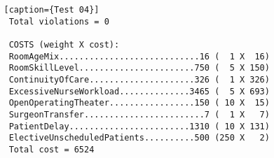 \begin{lstlisting}   [caption={Test 04}]
    Total violations = 0
    
    COSTS (weight X cost): 
    RoomAgeMix............................16 (  1 X  16)
    RoomSkillLevel.......................750 (  5 X 150)
    ContinuityOfCare.....................326 (  1 X 326)
    ExcessiveNurseWorkload..............3465 (  5 X 693)
    OpenOperatingTheater.................150 ( 10 X  15)
    SurgeonTransfer........................7 (  1 X   7)
    PatientDelay........................1310 ( 10 X 131)
    ElectiveUnscheduledPatients..........500 (250 X   2)
    Total cost = 6524
\end{lstlisting}